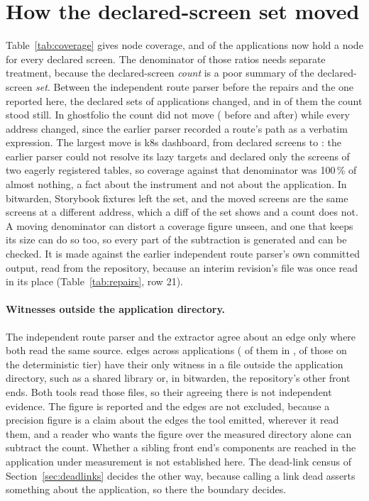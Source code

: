 \section{How the declared-screen set moved}
\label{app:setmoved}

Table~\ref{tab:coverage} gives node coverage, and \RoundTwoFullNodes{} of the \CensusApps{} applications now hold a node for every declared screen. The denominator of those ratios needs separate treatment, because the declared-screen \emph{count} is a poor summary of the declared-screen \emph{set}. Between the independent route parser before the repairs and the one reported here, the declared sets of \RoundTwoSetMoved{} applications changed, and in \RoundTwoSetMovedCountSame{} of them the count stood still. In ghostfolio the count did not move (\RoundTwoEarlierOracleGhostfolioDeclared{} before and \RoundTwoEarlierOracleGhostfolioNow{} after) while every address changed, since the earlier parser recorded a route's path as a verbatim expression. The largest move is k8s dashboard, from \RoundTwoEarlierOracleKdashDeclared{} declared screens to \RoundTwoEarlierOracleKdashNow{}: the earlier parser could not resolve its \NodeAuditBlindSpotsKdash{} lazy targets and declared only the screens of two eagerly registered tables, so coverage against that denominator was 100\,\% of almost nothing, a fact about the instrument and not about the application. In bitwarden, \RoundTwoEarlierOracleBitwardenStorybook{} Storybook fixtures left the set, and the moved screens are the same screens at a different address, which a diff of the set shows and a count does not. A moving denominator can distort a coverage figure unseen, and one that keeps its size can do so too, so every part of the subtraction is generated and can be checked. It is made against the earlier independent route parser's own committed output, read from the repository, because an interim revision's file was once read in its place (Table~\ref{tab:repairs}, row 21).

\paragraph{Witnesses outside the application directory.} The independent route parser and the extractor agree about an edge only where both read the same source. \RoundTwoOutsideWitness{} edges across \RoundTwoOutsideWitnessApps{} applications (\RoundTwoOutsideWitnessWorstN{} of them in \RoundTwoOutsideWitnessWorst{}, \RoundTwoOutsideWitnessWorstMust{} of those on the deterministic tier) have their only witness in a file outside the application directory, such as a shared library or, in bitwarden, the repository's other front ends. Both tools read those files, so their agreeing there is not independent evidence. The figure is reported and the edges are not excluded, because a precision figure is a claim about the edges the tool emitted, wherever it read them, and a reader who wants the figure over the measured directory alone can subtract the count. Whether a sibling front end's components are reached in the application under measurement is not established here. The dead-link census of Section~\ref{sec:deadlinks} decides the other way, because calling a link dead asserts something about the application, so there the boundary decides.

